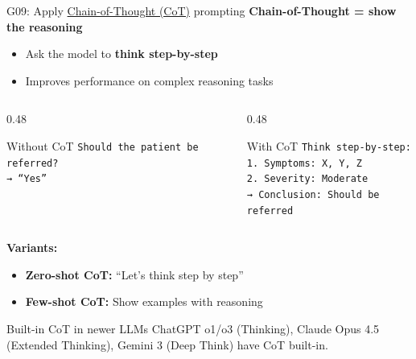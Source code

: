 \documentclass[aspectratio=169, 10pt]{beamer}
\begin{document}
\begin{frame}{G09: Apply \href{https://en.wikipedia.org/wiki/Prompt_engineering\#Chain-of-thought}{Chain-of-Thought (CoT)} prompting}
    \textbf{Chain-of-Thought = show the reasoning}
    \begin{itemize}
        \item Ask the model to \textbf{think step-by-step}
        \item Improves performance on complex reasoning tasks
    \end{itemize}

    \vspace{0.2cm}
    \begin{columns}[T]
        \begin{column}{0.48\textwidth}
            \begin{alertblock}{\footnotesize Without CoT}
                \footnotesize
                \texttt{Should the patient be referred?} \\
                \texttt{→ ``Yes''}
            \end{alertblock}
        \end{column}
        \begin{column}{0.48\textwidth}
            \begin{block}{\footnotesize With CoT}
                \footnotesize
                \texttt{Think step-by-step:} \\
                \texttt{1. Symptoms: X, Y, Z} \\
                \texttt{2. Severity: Moderate} \\
                \texttt{→ Conclusion: Should be referred}
            \end{block}
        \end{column}
    \end{columns}

    \vspace{0.15cm}
    \textbf{Variants:}
    \begin{itemize}
        \item \textbf{Zero-shot CoT:} ``Let's think step by step''
        \item \textbf{Few-shot CoT:} Show examples with reasoning
    \end{itemize}

    \begin{block}{\footnotesize Built-in CoT in newer LLMs}
        \footnotesize ChatGPT o1/o3 (Thinking), Claude Opus 4.5 (Extended Thinking), Gemini 3 (Deep Think) have CoT built-in.
    \end{block}
\end{frame}
\end{document}
